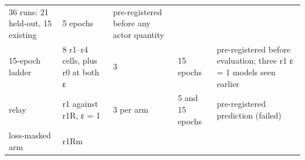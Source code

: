 \documentclass[10pt]{article}
\begin{document}
\begin{longtable}[]{@{}lllll@{}}
\begin{minipage}[t]{0.17\columnwidth}
36 runs: 21 held-out, 15 existing\strut
\end{minipage} & \begin{minipage}[t]{0.17\columnwidth}\raggedright
5 epochs\strut
\end{minipage} & \begin{minipage}[t]{0.17\columnwidth}\raggedright
pre-registered before any actor quantity\strut
\end{minipage}\tabularnewline
\begin{minipage}[t]{0.17\columnwidth}\raggedright
15-epoch ladder\strut
\end{minipage} & \begin{minipage}[t]{0.17\columnwidth}\raggedright
8 r1--r4 cells, plus r0 at both ε\strut
\end{minipage} & \begin{minipage}[t]{0.17\columnwidth}\raggedright
3\strut
\end{minipage} & \begin{minipage}[t]{0.17\columnwidth}\raggedright
15 epochs\strut
\end{minipage} & \begin{minipage}[t]{0.17\columnwidth}\raggedright
pre-registered before evaluation; three r1 ε = 1 models seen earlier\strut
\end{minipage}\tabularnewline
\begin{minipage}[t]{0.17\columnwidth}\raggedright
relay\strut
\end{minipage} & \begin{minipage}[t]{0.17\columnwidth}\raggedright
r1 against r1R, ε = 1\strut
\end{minipage} & \begin{minipage}[t]{0.17\columnwidth}\raggedright
3 per arm\strut
\end{minipage} & \begin{minipage}[t]{0.17\columnwidth}\raggedright
5 and 15 epochs\strut
\end{minipage} & \begin{minipage}[t]{0.17\columnwidth}\raggedright
pre-registered prediction (failed)\strut
\end{minipage}\tabularnewline
\begin{minipage}[t]{0.17\columnwidth}\raggedright
loss-masked arm\strut
\end{minipage} & \begin{minipage}[t]{0.17\columnwidth}\raggedright
r1Rm\strut
\end{minipage} & \begin{minipage}[t]{0.17\columnwidth}\raggedright

\end{minipage}
\end{longtable}
\end{document}
